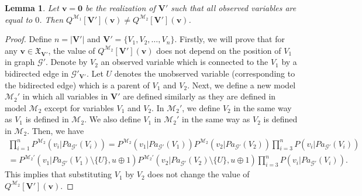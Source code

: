\documentclass[accepted]{uai2022}
\newtheorem{lemma}{Lemma}
\newcommand{\Pa}[2]{\textit{Pa}_{#2}(#1)}
\newcommand{\V}[0]{\mathbf{V}}
\newcommand{\G}[0]{\mathcal{G}}
\newcommand{\M}[0]{\mathcal{M}}
\newcommand{\dom}[1]{\mathfrak{X}_{#1}}
\begin{document}
    \begin{lemma}
        Let $\mathbf{v}=\mathbf{0}$ be the realization of $\V'$ such that all observed variables are equal to $0$. 
        Then $Q^{\M_1}[\V'](\mathbf{v}) \neq Q^{\M_2}[\V'](\mathbf{v})$.
    \end{lemma}
    \begin{proof}
        Define  $n=|\V'|$ and $\V' = \{V_1, V_2, \dots, V_n\}$. Firstly, we will prove that for any $\mathbf{v} \in \dom{\V'}$, the value of $Q^{\M_2}[\V'](\mathbf{v})$ does not depend on the position of $V_1$ in graph $\G'$. 
        Denote by $V_2$ an observed variable which is connected to the $V_1$ by a bidirected edge in $\G'_{\V'}$.
        Let $U$ denotes the unobserved variable (corresponding to the bidirected edge) which is a parent of $V_1$ and $V_2$. 
        Next, we define a new model $\M_2'$ in which all variables in $\V'$ are defined similarly as they are defined in model $\M_2$ except for variables $V_1$ and $V_2$. 
        In $\M_2'$, we define $V_2$ in the same way as $V_1$ is defined in  $\M_2$.
        We also define $V_1$ in $\M_2'$ in the same way as $V_2$ is defined in $\M_2$.
        Then, we have
        \begin{align*}
            \prod_{i=1}^n P^{\M_2}(v_i|\Pa{V_i}{\G'}) = P^{\M_2}(v_1|\Pa{V_1}{\G'})P^{\M_2}(v_2|\Pa{V_2}{\G'})\prod_{i=3}^{n}P(v_i|\Pa{V_i}{\G'}) \\
            = P^{\M_2'}(v_1|\Pa{V_1}{\G'}\setminus\{U\}, u\oplus 1)P^{\M_2'}(v_2|\Pa{V_2}{\G'}\setminus\{U\}, u\oplus 1)\prod_{i=3}^{n}P(v_i|\Pa{V_i}{\G'}).
        \end{align*}
        This implies that substituting $V_1$ by $V_2$ does not change the value of $Q^{\M_2}[\V'](\mathbf{v})$.
        

\end{proof}
\end{document}
